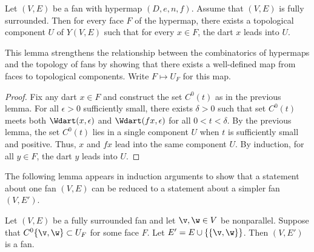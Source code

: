 \begin{lemma} \label{lemma:UF}
Let $(V,E)$ be a fan with hypermap $(D,e,n,f)$.  Assume that $(V,E)$
is fully surrounded.  Then for every face $F$ of the hypermap, there
exists a topological component $U$ of $Y(V,E)$ such that for every
$x\in F$, the dart $x$ leads into $U$.
\end{lemma}
%
%
%

This lemma strengthens the relationship between the
combinatorics of hypermaps and the topology of fans by showing that there exists a
well-defined map from faces to topological components.  Write
$F\mapsto U_F$ for this map.
%

\begin{proof} Fix any dart $x\in F$ and construct the set $C^0(t)$ as
in the previous lemma.  For all $\epsilon>0$ sufficiently small,
there exists $\delta>0$ such that set $C^0(t)$ meets both
$\Wdart(x,\epsilon)$ and $\Wdart(f x,\epsilon)$ for all
$0<t<\delta$.  By the previous lemma, the set $C^0(t)$ lies in a
single component $U$ when $t$ is sufficiently small and positive.
Thus, $x$ and $f x$ lead into the same component $U$.  By induction,
for all $y\in F$, the dart $y$ leads into $U$.
\end{proof}

The following lemma appears in induction arguments to show
that a statement about one fan $(V,E)$ can be reduced to a statement
about a simpler fan $(V,E')$.

\begin{lemma}\cutrate{}\label{lemma:add-edge}
  Let $(V,E)$ be a fully surrounded fan and let $\v,\w\in V$ be
  nonparallel.  Suppose that $C^0\{\v,\w\}\subset U_F$ for some face
  $F$.  Let $E' = E\cup\{\{\v,\w\}\}$.  Then $(V,E')$ is a fan.
\end{lemma}

